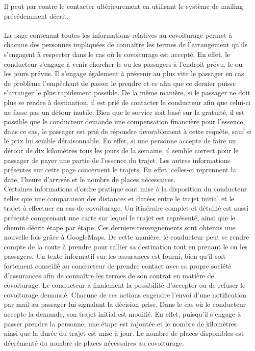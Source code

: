 \documentclass[12pt, a4paper, oneside]{article}
\begin{document}
        Il peut par contre le contacter ultérieurement en utilisant le système de mailing précédemment décrit.\\\\
        \indent La page contenant toutes les informations relatives au covoiturage permet à chacune des personnes impliquées de connaître les termes de l'arrangement qu'ils s'engagent à respecter dans le cas où le covoiturage est accepté. En effet, le conducteur s'engage à venir chercher le ou les passagers à l'endroit prévu, le ou les jours prévus. Il s'engage également à prévenir au plus vite le passager en cas de problème l'empêchant de passer le prendre et ce afin que ce dernier puisse s'arranger le plus rapidement possible. De la même manière, si le passager ne doit plus se rendre à destination, il est prié de contacter le conducteur afin que celui-ci ne fasse pas un détour inutile. Bien que le service soit basé sur la gratuité, il est possible que le conducteur demande une compensation financière pour l'essence, dans ce cas, le passager est prié de répondre favorablement à cette requête, sauf si le prix lui semble déraisonnable. En effet, si une personne accepte de faire un détour de dix kilomètres tous les jours de la semaine, il semble correct pour le passager de payer une partie de l'essence du trajet. Les autres informations présentes sur cette page concernent le trajets. En effet, celles-ci reprennent la date, l'heure d'arrivée et le nombre de places nécessaires. \\
        \indent Certaines informations d'ordre pratique sont mise à la disposition du conducteur telles que une comparaison des distances et durées entre le trajet initial et le trajet à effectuer en cas de covoiturage. Un itinéraire complet et détaillé est aussi présenté comprenant une carte sur lequel le trajet est représenté, ainsi que le chemin décrit étape par étape. Ces derniers renseignements sont obtenus une nouvelle fois grâce à GoogleMaps. De cette manière, le conducteur peut se rendre compte de la route à prendre pour rallier sa destination tout en prenant le ou les passagers. Un texte informatif sur les assurances est fourni, bien qu'il soit fortement conseillé au conducteur de prendre contact avec sa propre société d'assurances afin de connaître les termes de son contrat en matière de covoiturage. Le conducteur a finalement la possibilité d'accepter ou de refuser le covoiturage demandé. Chacune de ces actions engendre l'envoi d'une notification par mail au passager lui signalant la décision prise. Dans le cas où le conducteur accepte la demande, son trajet initial est modifié. En effet, puisqu'il s'engage à passer prendre la personne, une étape est rajoutée et le nombre de kilomètres ainsi que la durée du trajet est mise à jour. Le nombre de places disponibles est décrémenté du nombre de places nécessaires au covoiturage.\\\\
\end{document}
